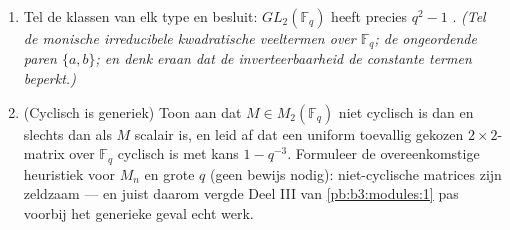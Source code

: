 \begin{problem}
\begin{enumerate}[resume]
        karakteristieke veelterm.
  \item Tel de klassen van elk type en besluit: $GL_2(\mathbb F_q)$
        heeft precies $q^2 - 1$ . \emph{(Tel de
        monische irreducibele kwadratische veeltermen over $\mathbb
        F_q$; de ongeordende paren $\{a, b\}$; en denk eraan dat de
        inverteerbaarheid de constante termen beperkt.)}
  \item (Cyclisch is generiek) Toon aan dat $M \in M_2(\mathbb
        F_q)$ niet cyclisch is dan en slechts dan als $M$ scalair
        is, en leid af dat een uniform toevallig gekozen
        $2\times2$-matrix over $\mathbb F_q$ cyclisch is met kans
        $1 - q^{-3}$. Formuleer de overeenkomstige heuristiek voor
        $M_n$ en grote $q$ (geen bewijs nodig): niet-cyclische
        matrices zijn zeldzaam --- en juist daarom vergde Deel III
        van \cref{pb:b3:modules:1} pas voorbij het generieke geval
        echt werk.
\end{enumerate}


\end{problem}
